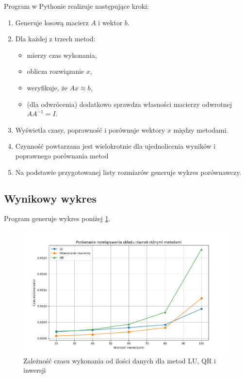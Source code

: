 \documentclass[a4paper,12pt]{article}
\begin{document}
Program w Pythonie realizuje następujące kroki:
\begin{enumerate}
  \item Generuje losową macierz \(A\) i wektor \(b\).
  \item Dla każdej z trzech metod:
    \begin{itemize}
      \item mierzy czas wykonania,
      \item oblicza rozwiązanie \(x\),
      \item weryfikuje, że \(Ax \approx b\),
      \item (dla odwrócenia) dodatkowo sprawdza własności macierzy odwrotnej \(A A^{-1}=I\).
    \end{itemize}
  \item Wyświetla czasy, poprawność i porównuje wektory \(x\) między metodami.
  \item Czynność powtarzana jest wielokrotnie dla ujednolicenia wyników i poprawnego porównania metod
  \item Na podstawie przygotowanej listy rozmiarów generuje wykres porównawczy.
\end{enumerate}

\subsection{Wynikowy wykres}

Program generuje wykres poniżej \ref{fig:time_result}.

\begin{figure}[H]
    \centering
    \includegraphics[width=1\linewidth]{Small_values.png}
    \caption{Zależność czasu wykonania od ilości danych dla metod LU, QR i inwersji}
    \label{fig:time_result}
\end{figure}
\end{document}
